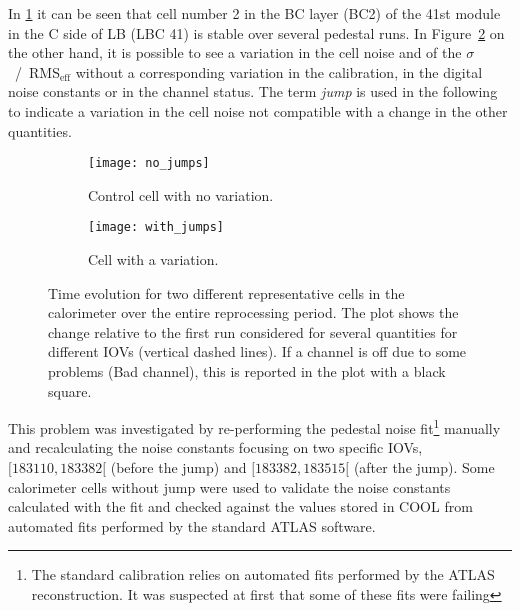 In \cref{fig:no_jumps} it can be seen that cell number 2 in the BC layer (BC2)
of the 41st module in the C side of LB (LBC 41) is stable over several pedestal
runs. In Figure~\ref{fig:with_jumps} on the other hand, it is possible to see a
variation in the cell noise and of the $\sigma$~/~RMS$_{\text{eff}}$ without a
corresponding variation in the calibration, in the digital noise constants or in
the channel status. The term \emph{jump} is used in the following to indicate a
variation in the cell noise not compatible with a change in the other
quantities.
\begin{figure}[!ht]
  \centering
  \begin{subfigure}[t]{.95\linewidth}
    \texttt{[image: no\_jumps]}
    \caption{Control cell with no variation.}
    \label{fig:no_jumps}
  \end{subfigure}
  \begin{subfigure}[t]{.95\linewidth}
    \texttt{[image: with\_jumps]}
    \caption{Cell with a variation.}
    \label{fig:with_jumps}
  \end{subfigure}
  \caption{Time evolution for two different representative cells in the
    calorimeter over the entire reprocessing period. The plot shows the change
    relative to the first run considered for several quantities for different
    IOVs (vertical dashed lines). If a channel is off due to some problems (Bad
    channel), this is reported in the plot with a black square.}
  \label{fig:jumps}
\end{figure}

This problem was investigated by re-performing the pedestal noise
fit\footnote{The standard calibration relies on automated fits performed by the
  ATLAS reconstruction. It was suspected at first that some of these fits were
  failing} manually and recalculating the noise constants focusing on two
specific IOVs, $[183110, 183382[$ (before the jump) and $[183382, 183515[$
(after the jump). Some calorimeter cells without jump were used to validate the
noise constants calculated with the fit and checked against the values stored in
COOL from automated fits performed by the standard ATLAS software.

